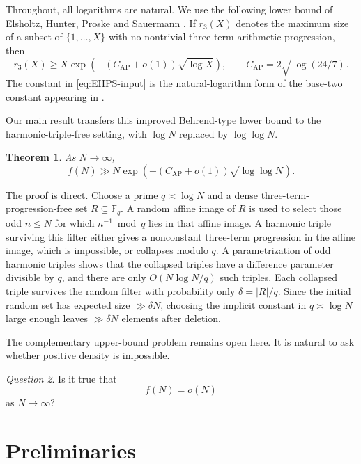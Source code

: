 \documentclass[11pt]{article}
\theoremstyle{plain}
\newtheorem{theorem}{Theorem}[section]
\theoremstyle{remark}
\newtheorem{question}[theorem]{Question}
\newcommand{\F}{\mathbb F}
\newcommand{\AP}{\mathrm{AP}}
\begin{document}
Throughout, all logarithms are natural.  We use the following lower bound of Elsholtz, Hunter, Proske and Sauermann \cite{EHPS2024}.  If $r_3(X)$ denotes the maximum size of a subset of $\{1,\ldots,X\}$ with no nontrivial three-term arithmetic progression, then
\begin{equation}\label{eq:EHPS-input}
  r_3(X)\ge X\exp\!\left(-(C_{\AP}+o(1))\sqrt{\log X}\right),
  \qquad C_{\AP}=2\sqrt{\log(24/7)} .
\end{equation}
The constant in \eqref{eq:EHPS-input} is the natural-logarithm form of the base-two constant appearing in \cite{EHPS2024}.

Our main result transfers this improved Behrend-type lower bound to the harmonic-triple-free setting, with $\log N$ replaced by $\log\log N$.

\begin{theorem}\label{thm:main}
As $N\to\infty$,
\begin{equation}\label{eq:main-bound}
  f(N)\gg N\exp\!\left(-(C_{\AP}+o(1))\sqrt{\log\log N}\right).
\end{equation}
\end{theorem}

The proof is direct.  Choose a prime $q\asymp\log N$ and a dense three-term-progression-free set $R\subseteq\F_q$.  A random affine image of $R$ is used to select those odd $n\le N$ for which $n^{-1}\bmod q$ lies in that affine image.  A harmonic triple surviving this filter either gives a nonconstant three-term progression in the affine image, which is impossible, or collapses modulo $q$.  A parametrization of odd harmonic triples shows that the collapsed triples have a difference parameter divisible by $q$, and there are only $O(N\log N/q)$ such triples.  Each collapsed triple survives the random filter with probability only $\delta=|R|/q$.  Since the initial random set has expected size $\gg \delta N$, choosing the implicit constant in $q\asymp\log N$ large enough leaves $\gg\delta N$ elements after deletion.

The complementary upper-bound problem remains open here.  It is natural to ask whether positive density is impossible.

\begin{question}\label{ques:density-zero}
Is it true that
\[
  f(N)=o(N)
\]
as $N\to\infty$?
\end{question}

\section{Preliminaries}
\end{document}

